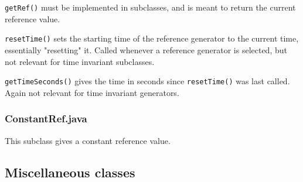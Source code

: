 \texttt{getRef()} must be implemented in subclasses, and is meant to return the current reference value.

\texttt{resetTime()} sets the starting time of the reference generator to the current time, essentially "resetting" it. Called whenever a reference generator is selected, but not relevant for time invariant subclasses.

\texttt{getTimeSeconds()} gives the time in seconds since \texttt{resetTime()} was last called. Again not relevant for time invariant generators.

\subsubsection{ConstantRef.java}
This subclass gives a constant reference value. 

\subsection{Miscellaneous classes} 	%




